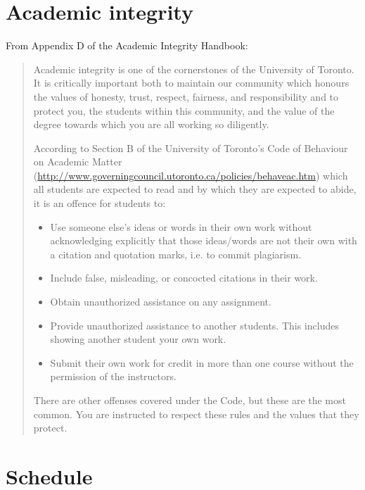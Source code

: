 \documentclass{article}
\begin{document}
\section*{Academic integrity}

From Appendix D of the Academic Integrity Handbook:
\begin{quote}
  Academic integrity is one of the cornerstones of the University of
  Toronto. It is critically important both to maintain our community
  which honours the values of honesty, trust, respect, fairness, and
  responsibility and to protect you, the students within this
  community, and the value of the degree towards which you are all
  working so diligently.  

  According to Section B of the University of
  Toronto's Code of Behaviour on Academic Matter
  (\url{http://www.governingcouncil.utoronto.ca/policies/behaveac.htm})
  which all students are expected to read and by which they are
  expected to abide, it is an offence for students to:
  \begin{itemize}
    \item Use someone else's ideas or words in their own work without
      acknowledging explicitly that those ideas/words are not their
      own with a citation and quotation marks, i.e. to commit
      plagiarism.
  \item Include false, misleading, or concocted citations in their
    work.
  \item Obtain unauthorized assistance on any assignment. 
  \item Provide unauthorized assistance to another students. This
    includes showing another student your own work.
  \item Submit their own work for credit in more than one course
      without the permission of the instructors.
  \end{itemize}

  There are other offenses covered under the Code, but these are the
  most common. You are instructed to respect these rules and the
  values that they protect.
\end{quote}

\section*{Schedule}
\end{document}
